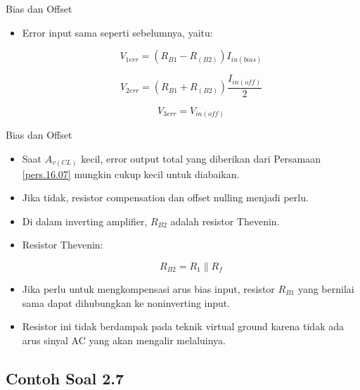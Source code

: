 \begin{frame}[t]{Bias dan Offset}
	\begin{itemize}
		\item Error input sama seperti sebelumnya, yaitu:
		
		\begin{equation}\label{pers.16.08}
			V_{1err} = (R_{B1} - R_{(B2)}) I_{in(bias)}
		\end{equation}
	
		\begin{equation}\label{pers.16.09}
			V_{2err} = (R_{B1} + R_{(B2)}) \frac{I_{in(off)}}{2}
		\end{equation}
	
		\begin{equation}\label{pers.16.10}
			V_{3err} = V_{in(off)}
		\end{equation}
	
	\end{itemize}
\end{frame}

\begin{frame}[t]{Bias dan Offset}
	\begin{itemize}
		\item Saat $ A_{v(CL)} $ kecil, error output total yang diberikan dari Persamaan \ref{pers.16.07} mungkin cukup kecil untuk diabaikan.
		\item Jika tidak, resistor compensation dan offset nulling menjadi perlu.
		\item Di dalam inverting amplifier, $ R_{B2} $ adalah resistor Thevenin.
		\item Resistor Thevenin:
		
		\begin{equation}\label{pers.16.11}
			R_{B2} = R_1 \parallel R_f
		\end{equation}

		\item Jika perlu untuk mengkompensasi arus bias input, resistor $ R_{B1} $ yang bernilai sama dapat dihubungkan ke noninverting input.
		\item Resistor ini tidak berdampak pada teknik virtual ground karena tidak ada arus sinyal AC yang akan mengalir melaluinya.
	\end{itemize}
\end{frame}



\subsection{Contoh Soal 2.7}

